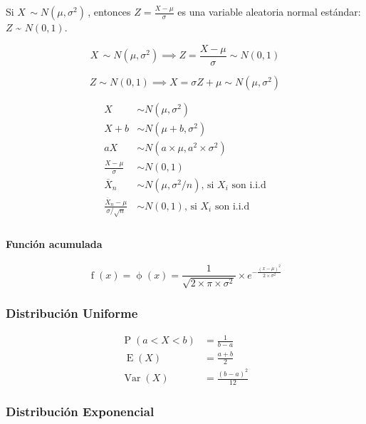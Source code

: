 \documentclass[
]{article}
\begin{document}
Si \({X\,\sim N(\mu ,\sigma ^{2})\,}\), entonces
\({Z={\frac {X-\mu }{\sigma }}\!}\) es una variable aleatoria normal
estándar: \(Z\) \textasciitilde{} \(N(0,1)\).

\[{X\,\sim N(\mu, \sigma ^{2}) \implies Z={\frac {X-\mu }{\sigma }} \sim N(0,1)}\]

\[{Z\sim N(0,1) \implies X = \sigma Z + \mu \sim N(\mu, \sigma ^{2})}\]

\[
\begin{align}
    X & \sim N(\mu, \sigma^2) \\
    X+b & \sim N(\mu+b, \sigma^2) \\
    aX & \sim N(a \times \mu, a^2 \times \sigma^2) \\
    \frac{X - \mu}{\sigma} & \sim N(0, 1) \\
    \overline{X}_n & \sim N(\mu, \sigma^2/n) \text{, si } X_i \text{ son i.i.d}\\
    \frac{\overline{X}_n - \mu}{\sigma/\sqrt{n}} & \sim N(0, 1) \text{, si } X_i \text{ son i.i.d} \\
\end{align}
\]

\hypertarget{funciuxf3n-acumulada}{%
\paragraph{Función acumulada}\label{funciuxf3n-acumulada}}

\[
    \operatorname{f}(x) = \operatorname{\phi}(x) = \frac{1}{\sqrt{2 \times \pi \times \sigma^2}} \times e^{-\frac{(x-\mu)^2}{2 \times \sigma^2}}
\]

\hypertarget{distribuciuxf3n-uniforme}{%
\subsubsection{Distribución Uniforme}\label{distribuciuxf3n-uniforme}}

\[
\begin{align}
    \operatorname{P} (a<X<b) & =\frac {1}{b-a} \\\
    \operatorname{E}(X) & = \frac{a+b}{2} \\
    \operatorname{Var}(X) & = \frac{(b-a)^2}{12}
\end{align}
\]

\hypertarget{distribuciuxf3n-exponencial}{%
\subsubsection{Distribución
Exponencial}\label{distribuciuxf3n-exponencial}}
\end{document}
